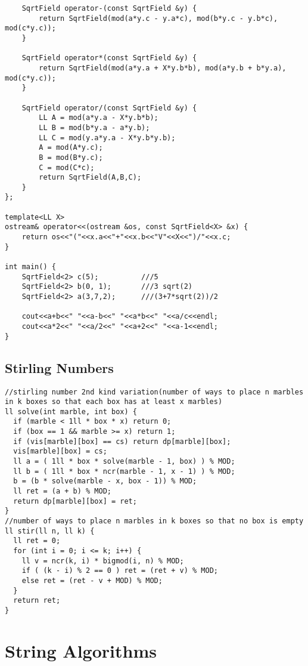 \documentclass[10pt,a4paper,onesided]{article}
\begin{document}
\begin{multicols*}{3}
\begin{lstlisting}
    SqrtField operator-(const SqrtField &y) {
        return SqrtField(mod(a*y.c - y.a*c), mod(b*y.c - y.b*c), mod(c*y.c));
    }

    SqrtField operator*(const SqrtField &y) {
        return SqrtField(mod(a*y.a + X*y.b*b), mod(a*y.b + b*y.a), mod(c*y.c));
    }

    SqrtField operator/(const SqrtField &y) {
        LL A = mod(a*y.a - X*y.b*b);
        LL B = mod(b*y.a - a*y.b);
        LL C = mod(y.a*y.a - X*y.b*y.b);
        A = mod(A*y.c);
        B = mod(B*y.c);
        C = mod(C*c);
        return SqrtField(A,B,C);
    }
};

template<LL X>
ostream& operator<<(ostream &os, const SqrtField<X> &x) {
    return os<<"("<<x.a<<"+"<<x.b<<"V"<<X<<")/"<<x.c;
}

int main() {
    SqrtField<2> c(5);          ///5
    SqrtField<2> b(0, 1);       ///3 sqrt(2)
    SqrtField<2> a(3,7,2);      ///(3+7*sqrt(2))/2

    cout<<a+b<<" "<<a-b<<" "<<a*b<<" "<<a/c<<endl;
    cout<<a*2<<" "<<a/2<<" "<<a+2<<" "<<a-1<<endl;
}
\end{lstlisting}
\subsection{Stirling Numbers}
\begin{lstlisting}
//stirling number 2nd kind variation(number of ways to place n marbles in k boxes so that each box has at least x marbles)
ll solve(int marble, int box) {
  if (marble < 1ll * box * x) return 0;
  if (box == 1 && marble >= x) return 1;
  if (vis[marble][box] == cs) return dp[marble][box];
  vis[marble][box] = cs;
  ll a = ( 1ll * box * solve(marble - 1, box) ) % MOD;
  ll b = ( 1ll * box * ncr(marble - 1, x - 1) ) % MOD;
  b = (b * solve(marble - x, box - 1)) % MOD;
  ll ret = (a + b) % MOD;
  return dp[marble][box] = ret;
}
//number of ways to place n marbles in k boxes so that no box is empty
ll stir(ll n, ll k) {
  ll ret = 0;
  for (int i = 0; i <= k; i++) {
    ll v = ncr(k, i) * bigmod(i, n) % MOD;
    if ( (k - i) % 2 == 0 ) ret = (ret + v) % MOD;
    else ret = (ret - v + MOD) % MOD;
  }
  return ret;
}
\end{lstlisting}
\section{String Algorithms}

\end{multicols*}
\end{document}
